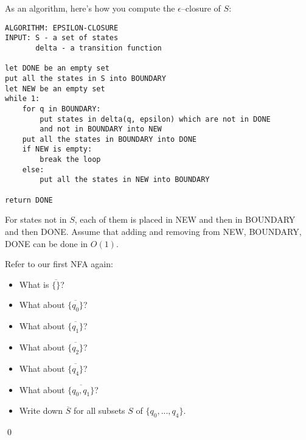 As an algorithm, here's how you compute the $\epsilon$--closure of $S$:
\begin{Verbatim}[frame=single, fontsize=\small]
ALGORITHM: EPSILON-CLOSURE
INPUT: S - a set of states
       delta - a transition function

let DONE be an empty set
put all the states in S into BOUNDARY
let NEW be an empty set       
while 1:
    for q in BOUNDARY:
        put states in delta(q, epsilon) which are not in DONE
        and not in BOUNDARY into NEW
    put all the states in BOUNDARY into DONE
    if NEW is empty:
        break the loop
    else:
        put all the states in NEW into BOUNDARY

return DONE
\end{Verbatim}
For states not in $S$, each of them is placed in NEW and then in
BOUNDARY and then DONE.
Assume that adding and removing from NEW, BOUNDARY, DONE
can be done in $O(1)$.
\newpage
\begin{ex}
Refer to our first NFA again:
\begin{center}
\end{center}
\begin{itemize}
\item What is $\overline{\{\}}$? 
\item What about $\overline{\{q_0\}}$?
\item What about $\overline{\{q_1\}}$?
\item What about $\overline{\{q_2\}}$?
\item What about $\overline{\{q_4\}}$?
\item What about $\overline{\{q_0, q_1\}}$?
\item Write down $\overline{S}$ for all subsets $S$ of $\{q_0, ..., q_4\}$.
\end{itemize}
\qed
\end{ex}




